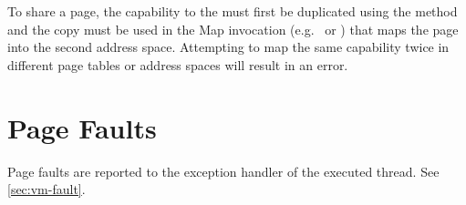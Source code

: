 To share a page, the capability to the  must first be duplicated using the
 method and the copy must be used in the Map invocation
(e.g.\  \ifxeightsix or
\fi) that maps the page into the second address space.
Attempting to map the same capability twice in different page tables or address spaces will result
in an error.


\section{Page Faults}

Page faults are reported to the exception handler of the executed thread.
See \autoref{sec:vm-fault}.
